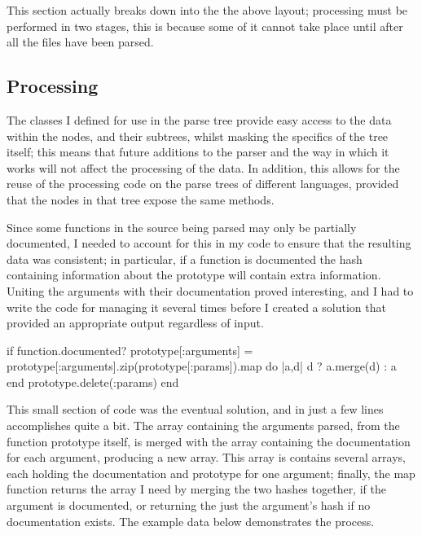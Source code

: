 This section actually breaks down into the the above layout; processing must be
performed in two stages, this is because some of it cannot take place until
after all the files have been parsed.

  \subsection{Processing}
    The classes I defined for use in the parse tree provide easy access to the
    data within the nodes, and their subtrees, whilst masking the specifics of
    the tree itself; this means that future additions to the parser and the way
    in which it works will not affect the processing of the data. In addition,
    this allows for the reuse of the processing code on the parse trees of
    different languages, provided that the nodes in that tree expose the same
    methods.

    Since some functions in the source being parsed may only be partially
    documented, I needed to account for this in my code to ensure that the
    resulting data was consistent; in particular, if a function is documented
    the hash containing information about the prototype will contain extra
    information. Uniting the arguments with their documentation proved
    interesting, and I had to write the code for managing it several times
    before I created a solution that provided an appropriate output regardless
    of input.

    \begin{code}[language=ruby, gobble=6]
      if function.documented?
        prototype[:arguments] = prototype[:arguments].zip(prototype[:params]).map do |a,d|
          d ? a.merge(d) : a
        end
        prototype.delete(:params)
      end
    \end{code}

    This small section of code was the eventual solution, and in just a few
    lines accomplishes quite a bit. The array containing the arguments
    parsed, from the function prototype itself, is merged with the array
    containing the documentation for each argument, producing a new array. This
    array is contains several arrays, each holding the documentation and
    prototype for one argument; finally, the map function returns the array I
    need by merging the two hashes together, if the argument is documented, or
    returning the just the argument's hash if no documentation exists. The
    example data below demonstrates the process.

